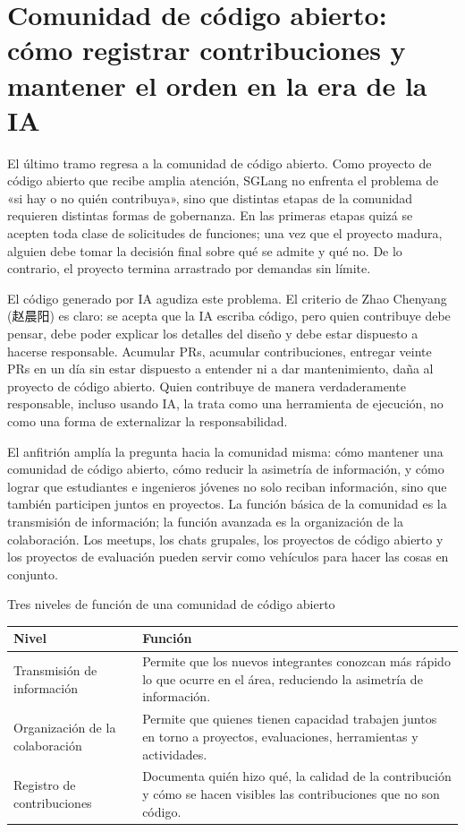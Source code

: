 \documentclass[a4paper]{article}
\begin{document}
\section{Comunidad de código abierto: cómo registrar contribuciones y mantener el orden en la era de la IA}

El último tramo regresa a la comunidad de código abierto. Como proyecto de código abierto que recibe amplia atención, SGLang no enfrenta el problema de «si hay o no quién contribuya», sino que distintas etapas de la comunidad requieren distintas formas de gobernanza. En las primeras etapas quizá se acepten toda clase de solicitudes de funciones; una vez que el proyecto madura, alguien debe tomar la decisión final sobre qué se admite y qué no. De lo contrario, el proyecto termina arrastrado por demandas sin límite.

El código generado por IA agudiza este problema. El criterio de Zhao Chenyang (赵晨阳) es claro: se acepta que la IA escriba código, pero quien contribuye debe pensar, debe poder explicar los detalles del diseño y debe estar dispuesto a hacerse responsable. Acumular PRs, acumular contribuciones, entregar veinte PRs en un día sin estar dispuesto a entender ni a dar mantenimiento, daña al proyecto de código abierto. Quien contribuye de manera verdaderamente responsable, incluso usando IA, la trata como una herramienta de ejecución, no como una forma de externalizar la responsabilidad.

El anfitrión amplía la pregunta hacia la comunidad misma: cómo mantener una comunidad de código abierto, cómo reducir la asimetría de información, y cómo lograr que estudiantes e ingenieros jóvenes no solo reciban información, sino que también participen juntos en proyectos. La función básica de la comunidad es la transmisión de información; la función avanzada es la organización de la colaboración. Los meetups, los chats grupales, los proyectos de código abierto y los proyectos de evaluación pueden servir como vehículos para hacer las cosas en conjunto.

\begin{knowledgebox}{Tres niveles de función de una comunidad de código abierto}
\begin{tabularx}{\textwidth}{>{\raggedright\arraybackslash}p{} Y}
\toprule
Nivel & Función \\
\midrule
Transmisión de información & Permite que los nuevos integrantes conozcan más rápido lo que ocurre en el área, reduciendo la asimetría de información. \\
Organización de la colaboración & Permite que quienes tienen capacidad trabajen juntos en torno a proyectos, evaluaciones, herramientas y actividades. \\
Registro de contribuciones & Documenta quién hizo qué, la calidad de la contribución y cómo se hacen visibles las contribuciones que no son código. \\
\bottomrule
\end{tabularx}
\end{knowledgebox}
\end{document}

